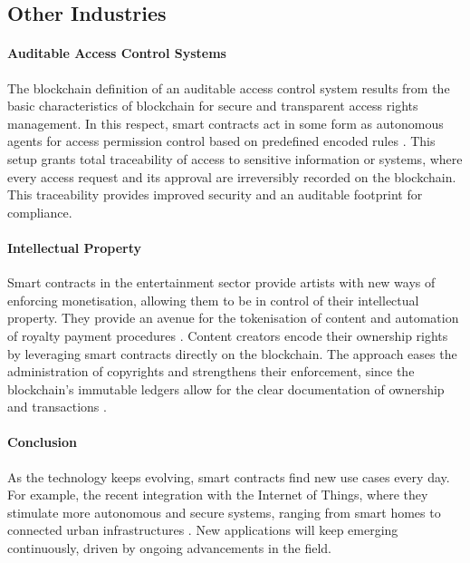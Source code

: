 \subsection{Other Industries}

\paragraph{Auditable Access Control Systems}

The blockchain definition of an auditable access control system results from the basic characteristics of blockchain for secure and transparent access rights management. In this respect, smart contracts act in some form as autonomous agents for access permission control based on predefined encoded rules \cite{DamianoEtAl2019}. This setup grants total traceability of access to sensitive information or systems, where every access request and its approval are irreversibly recorded on the blockchain. This traceability provides improved security and an auditable footprint for compliance. 

\paragraph{Intellectual Property}

Smart contracts in the entertainment sector provide artists with new ways of enforcing monetisation, allowing them to be in control of their intellectual property. They provide an avenue for the tokenisation of content and automation of royalty payment procedures \cite{Hauck2021}. Content creators encode their ownership rights by leveraging smart contracts directly on the blockchain. The approach eases the administration of copyrights and strengthens their enforcement, since the blockchain's immutable ledgers allow for the clear documentation of ownership and transactions \cite{Hauck2021}.

\paragraph{Conclusion}

As the technology keeps evolving, smart contracts find new use cases every day. For example, the recent integration with the Internet of Things, where they stimulate more autonomous and secure systems, ranging from smart homes to connected urban infrastructures \cite{SchmittEtAl2019}. New applications will keep emerging continuously, driven by ongoing advancements in the field.


